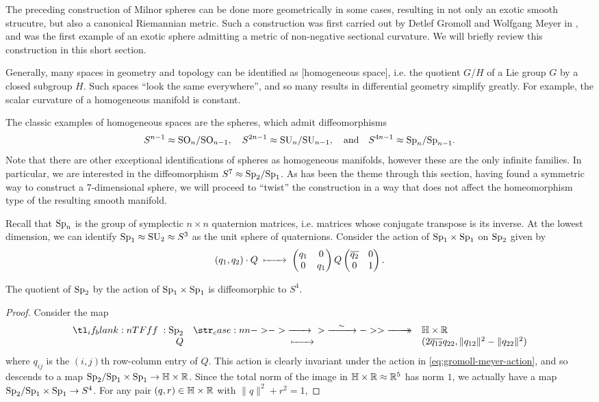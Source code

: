 The preceding construction of Milnor spheres can be done more geometrically in some cases, resulting in not only an exotic smooth strucutre, but also a canonical Riemannian metric. Such a construction was first carried out by Detlef Gromoll and Wolfgang Meyer in \cite{gromollmeyer1974curvature}, and was the first example of an exotic sphere admitting a metric of non-negative sectional curvature. We will briefly review this construction in this short section.

Generally, many spaces in geometry and topology can be identified as [homogeneous space], i.e. the quotient $G/H$ of a Lie group $G$ by a closed subgroup $H$. Such spaces ``look the same everywhere'', and so many results in differential geometry simplify greatly. For example, the scalar curvature of a homogeneous manifold is constant.

The classic examples of homogeneous spaces are the spheres, which admit diffeomorphisms 
\[
	S^{n-1}\approx \mathrm{SO}_n/\mathrm{SO}_{n-1},\quad S^{2n-1}\approx \mathrm{SU}_n/\mathrm{SU}_{n-1},\quad\textrm{and}\quad S^{4n-1}\approx \mathrm{Sp}_n/\mathrm{Sp}_{n-1}.
\]
Note that there are other exceptional identifications of spheres as homogeneous manifolds, however these are the only infinite families. In particular, we are interested in the diffeomorphism $S^7\approx \mathrm{Sp}_2/\mathrm{Sp}_1$. As has been the theme through this section, having found a symmetric way to construct a 7-dimensional sphere, we will proceed to ``twist'' the construction in a way that does not affect the homeomorphism type of the resulting smooth manifold.

Recall that $\mathrm{Sp}_n$ is the group of symplectic $n\times n$ quaternion matrices, i.e. matrices whose conjugate transpose is its inverse. At the lowest dimension, we can identify $\mathrm{Sp}_1\approx \mathrm{SU}_2\approx S^3$ as the unit sphere of quaternions. Consider the action of $\mathrm{Sp}_1\times \mathrm{Sp}_1$ on $\mathrm{Sp}_2$ given by
\begin{equation}\label{eq:gromoll-meyer-action}
	(q_1, q_2)\cdot Q \lkxmapsto \begin{pmatrix} q_1 & 0\\ 0 & q_1\end{pmatrix}Q\begin{pmatrix}\overline{q_2} & 0\\ 0 & 1\end{pmatrix}.
\end{equation}

\begin{proposition}
	The quotient of $\mathrm{Sp}_2$ by the action of $\mathrm{Sp}_1\times \mathrm{Sp}_1$ is diffeomorphic to $S^4$.
\end{proposition}
\begin{proof}
	Consider the map 
	\[
	\lkxfunc{f}{\Sp_2}{\HH\times \R}{Q}{(2\overline{q_{12}}q_{22}, \|q_{12}\|^2 - \|q_{22}\|^2)}
	\]
	where $q_{ij}$ is the $(i,j)$th row-column entry of $Q$. This action is clearly invariant under the action in \cref{eq:gromoll-meyer-action}, and so descends to a map $\mathrm{Sp}_2/\mathrm{Sp}_1\times \mathrm{Sp}_1 \to \mathbb{H}\times \mathbb{R}$. Since the total norm of the image in $\mathbb{H}\times \mathbb{R}\approx \mathbb{R}^5$ has norm $1$, we actually have a map $\mathrm{Sp}_2/\mathrm{Sp}_1\times \mathrm{Sp}_1\to S^4$. For any pair $(q,r)\in \mathbb{H}\times \mathbb{R}$ with $\|q\|^2+r^2=1$, 
\end{proof}

